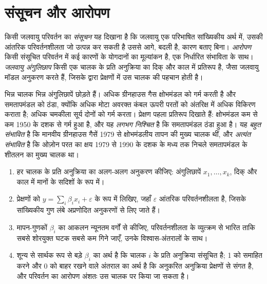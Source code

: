 \section{संसूचन और आरोपण}\label{sec:b2:anthropogenic-climate-change:attribution}

\begin{definition}[संसूचन; आरोपण; जलवायु अंगुलिछाप]\label{def:b2:anthropogenic-climate-change:da}
किसी जलवायु परिवर्तन का \emph{संसूचन} यह दिखाना है कि
जलवायु एक परिभाषित सांख्यिकीय अर्थ में, उसकी आंतरिक परिवर्तनशीलता जो उत्पन्न कर सकती है उससे आगे, बदली है,
कारण बताए बिना। \emph{आरोपण} किसी संसूचित परिवर्तन में कई कारणों के
योगदानों का मूल्यांकन है, एक निर्धारित संभाविता के साथ। \emph{जलवायु
अंगुलिछाप} किसी एक चालक के प्रति अनुक्रिया का दिक् और काल में प्रतिरूप है,
जैसा जलवायु मॉडल अनुकरण करते हैं, जिसके द्वारा प्रेक्षणों में उस चालक की पहचान होती है।
\end{definition}

भिन्न चालक भिन्न अंगुलिछापें छोड़ते हैं। अधिक ग्रीनहाउस गैस क्षोभमंडल को गर्म करती है और समतापमंडल को
ठंडा, क्योंकि अधिक मोटा अवरक्त कंबल ऊपरी परतों को अंतरिक्ष में अधिक विकिरण कराता है;
अधिक चमकीला सूर्य दोनों को गर्म करता। प्रेक्षण पहला प्रतिरूप दिखाते हैं: क्षोभमंडल कम से कम 1950 के दशक
से गर्म हुआ है, और यह \emph{लगभग निश्चित} है कि समतापमंडल ठंडा हुआ है। यह
\emph{बहुत संभावित} है कि मानवीय ग्रीनहाउस गैसें 1979 से क्षोभमंडलीय तापन की मुख्य चालक थीं,
और \emph{अत्यंत संभावित} है कि ओज़ोन परत का क्षय 1979 से 1990 के दशक के मध्य तक निचले समतापमंडल
के शीतलन का मुख्य चालक था।

\begin{method}[इष्टतम अंगुलिछाप-विधि]\label{met:b2:anthropogenic-climate-change:fingerprinting}
\begin{enumerate}
  \item हर चालक के प्रति अनुक्रिया का अलग-अलग अनुकरण कीजिए: अंगुलिछापें $x_1, \dots, x_k$, दिक् और काल
        में मानों के सदिशों के रूप में।
  \item प्रेक्षणों को $y = \sum_i \beta_i x_i + \varepsilon$ के रूप में लिखिए, जहाँ $\varepsilon$
        आंतरिक परिवर्तनशीलता है, जिसके सांख्यिकीय गुण लंबे अप्रणोदित अनुकरणों से लिए जाते हैं।
  \item मापन-गुणकों $\beta_i$ का आकलन न्यूनतम वर्गों से कीजिए, परिवर्तनशीलता के व्युत्क्रम से भारित
        ताकि सबसे शोरयुक्त घटक सबसे कम गिने जाएँ, उनके विश्वास-अंतरालों के साथ।
  \item शून्य से सार्थक रूप से बड़े $\beta_i$ का अर्थ है कि चालक $i$ के प्रति अनुक्रिया
        संसूचित है; 1 को समाहित करने और 0 को बाहर रखने वाले अंतराल का अर्थ है कि अनुकरित अनुक्रिया
        प्रेक्षणों से संगत है, और परिवर्तन का आरोपण अंशतः उस चालक पर किया जा सकता है।
\end{enumerate}
\end{method}


